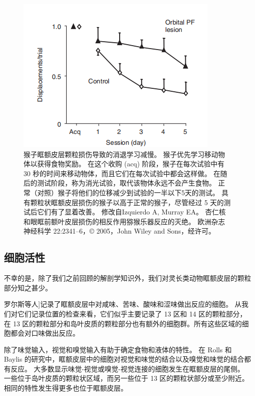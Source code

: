 \begin{figure}[!htb]
	\centering
	\includegraphics{image_pfc/Fig_4_4}
	\caption{猴子眶额皮层颗粒损伤导致的消退学习减慢。
		猴子优先学习移动物体以获得食物奖励。 
		在这个收购 (acq) 阶段，猴子在每次试验中有 30 秒的时间来移动物体，而且它们在每次试验中都会这样做。
		在随后的测试阶段，称为消光试验，取代该物体永远不会产生食物。
		正常（对照）猴子将他们的位移减少到试验的一半以下5天的测试。
		具有颗粒状眶额皮层损伤的猴子以高于正常的猴子，尽管经过 5 天的测试后它们有了显着改善。
		修改自Izquierdo A, Murray EA。 
		杏仁核和眼眶前额叶皮层损伤的相反作用猕猴乐器反应的灭绝。 
		欧洲杂志神经科学 22:2341–6，© 2005，John Wiley and Sons，经许可。}\label{fig:fig_4_4}
\end{figure}



\subsection{细胞活性}

不幸的是，除了我们之前回顾的解剖学知识外，我们对灵长类动物眶额皮层的颗粒部分知之甚少。\par


罗尔斯等人\cite{rolls1994emotion}]记录了眶额皮层中对咸味、苦味、酸味和涩味做出反应的细胞。
从我们对它们记录位置的检查来看，它们似乎主要记录了 13 区和 14 区的颗粒部分，在 13 区的颗粒部分和岛叶皮质的颗粒部分也有额外的细胞群。所有这些区域的细胞都会对口味做出反应。\par


除了味觉输入，视觉和嗅觉输入有助于确定食物和液体的特性。
在 Rolls 和 Baylis 的研究中，眶额皮层中的细胞对视觉和味觉的结合以及嗅觉和味觉的结合都有反应。
大多数显示味觉-视觉或嗅觉-视觉连接的细胞发生在眶额皮层的尾侧。
一些位于岛叶皮质的颗粒状区域，而另一些位于 13 区的颗粒状部分或至少附近。
相同的特性发生得更多也位于眶额皮层。\par


